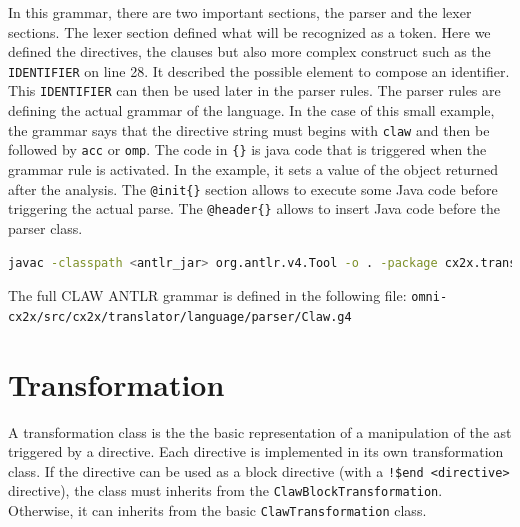 \documentclass[a4paper, 11pt]{report}
\begin{document}
In this grammar, there are two important sections, the parser and the lexer 
sections. The lexer section defined what will be recognized as a token. Here 
we defined the directives, the clauses but also more complex construct such as 
the \lstinline|IDENTIFIER| on line 28. It described the possible element to 
compose an identifier. This \lstinline|IDENTIFIER| can then be used later in 
the parser rules. 
The parser rules are defining the actual grammar of the language. In the case 
of this small example, the grammar says that the directive string must begins 
with \lstinline|claw| and then be followed by \lstinline|acc| or 
\lstinline|omp|. The code in \lstinline|{}| is java code that is triggered 
when the grammar rule is activated. In the example, it sets a value of the 
object returned after the analysis.
The \lstinline|@init{}| section allows to execute some Java code before 
triggering the actual parse. The \lstinline|@header{}| allows to insert Java 
code before the parser class.

\begin{lstlisting}[label=lst:antlr_cmd, caption=ANTLR parser generation command, language=bash]
javac -classpath <antlr_jar> org.antlr.v4.Tool -o . -package cx2x.translator.language.parser Claw.g4
\end{lstlisting}

The full CLAW ANTLR grammar is defined in the following file: 
\lstinline|omni-cx2x/src/cx2x/translator/language/parser/Claw.g4|

\chapter{Transformation}
\label{chapter:transformation}
A transformation class is the the basic representation of a manipulation of the
\gls{ast} triggered by a directive. Each directive is implemented in its own 
transformation class. If the directive can be used as a block directive (with a
\lstinline|!$end <directive>| directive), the class must inherits from the 
\lstinline!ClawBlockTransformation!. Otherwise, it can inherits from the basic 
\lstinline!ClawTransformation! class.
\end{document}
